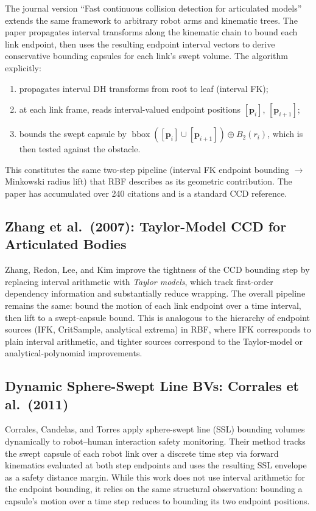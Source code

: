 \documentclass[11pt,a4paper]{article}
\begin{document}
The journal version ``Fast continuous collision detection for articulated
models'' \cite{redon2005fast} extends the same framework to arbitrary robot
arms and kinematic trees.  The paper propagates interval transforms along the
kinematic chain to bound each link endpoint, then uses the resulting endpoint
interval vectors to derive conservative bounding capsules for each link's
swept volume.  The algorithm explicitly:
\begin{enumerate}[nosep]
  \item propagates interval DH transforms from root to leaf (interval FK);
  \item at each link frame, reads interval-valued endpoint positions
        $[\mathbf{p}_i]$, $[\mathbf{p}_{i+1}]$;
  \item bounds the swept capsule by
        $\operatorname{bbox}([\mathbf{p}_i] \cup [\mathbf{p}_{i+1}]) \oplus
        B_2(r_i)$, which is then tested against the obstacle.
\end{enumerate}
This constitutes the same two-step pipeline (interval FK endpoint bounding
$\rightarrow$ Minkowski radius lift) that RBF describes as its geometric
contribution.  The paper has accumulated over 240 citations and is a standard
CCD reference.

\subsection{Zhang et al.\ (2007): Taylor-Model CCD for Articulated Bodies}

Zhang, Redon, Lee, and Kim \cite{zhang2007taylor} improve the tightness of the
CCD bounding step by replacing interval arithmetic with \emph{Taylor models},
which track first-order dependency information and substantially reduce wrapping.
The overall pipeline remains the same: bound the motion of each link endpoint
over a time interval, then lift to a swept-capsule bound.  This is analogous to
the hierarchy of endpoint sources (IFK, CritSample, analytical extrema) in
RBF, where IFK corresponds to plain interval arithmetic, and tighter sources
correspond to the Taylor-model or analytical-polynomial improvements.

\subsection{Dynamic Sphere-Swept Line BVs: Corrales et al.\ (2011)}

Corrales, Candelas, and Torres \cite{corrales2011dynamic} apply sphere-swept
line (SSL) bounding volumes dynamically to robot--human interaction safety
monitoring.  Their method tracks the swept capsule of each robot link over a
discrete time step via forward kinematics evaluated at both step endpoints and
uses the resulting SSL envelope as a safety distance margin.  While this work
does not use interval arithmetic for the endpoint bounding, it relies on the
same structural observation: bounding a capsule's motion over a time step
reduces to bounding its two endpoint positions.
\end{document}
